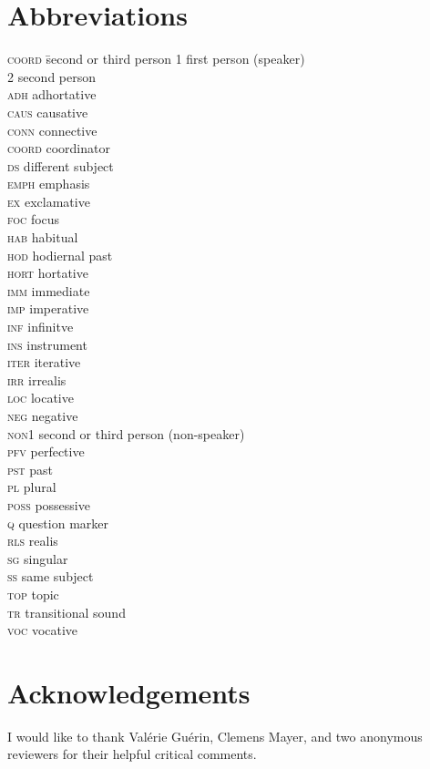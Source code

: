 \documentclass[output=paper]{LSP/langsci}
\begin{document}
			
			
\section*{Abbreviations}
\begin{multicols}{2}
\begin{tabbing}
\textsc{coord} \= second or third person\kill
\textsc{1}     \> first person (speaker)\\
\textsc{2}     \> second person\\
\textsc{adh}   \> adhortative\\
\textsc{caus}  \>  causative\\
\textsc{conn}  \>      connective\\
\textsc{coord} \>     coordinator\\
\textsc{ds}    \>    different subject\\
\textsc{emph}  \>      emphasis\\
\textsc{ex}    \>    exclamative\\
\textsc{foc}   \>     focus\\
\textsc{hab}   \>     habitual\\
\textsc{hod}   \>     hodiernal past\\
\textsc{hort}  \>      hortative\\
\textsc{imm}   \>     immediate\\
\textsc{imp}   \>     imperative\\
\textsc{inf}   \>     infinitve\\
\textsc{ins}   \>     instrument\\
\textsc{iter}  \>      iterative\\
\textsc{irr}   \>     irrealis\\
\textsc{loc}   \>     locative\\
\textsc{neg}   \>     negative\\
\textsc{non1}  \>      second or third person (non-speaker)\\
\textsc{pfv}   \>     perfective\\
\textsc{pst}   \>     past\\
\textsc{pl}    \>    plural\\
\textsc{poss}  \>      possessive\\
\textsc{q}     \>     question marker\\
\textsc{rls}   \>     realis\\
\textsc{sg}    \>    singular\\
\textsc{ss}    \>    same subject\\
\textsc{top}   \>     topic\\
\textsc{tr}    \>    transitional sound\\
\textsc{voc}   \>     vocative
\end{tabbing}
\end{multicols}

\section*{Acknowledgements}
I would like to thank Valérie Guérin, Clemens Mayer, and two anonymous reviewers for their helpful critical comments.


\sloppy

\printbibliography[heading=subbibliography,notkeyword=this]
\end{document}
